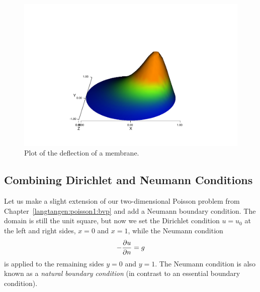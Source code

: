 \begin{figure}
  \begin{center}
    \includegraphics{chapters/langtangen/pdf/membrane_waxis.pdf}
    \caption{Plot of the deflection of a membrane.}
    \label{langtangen:poisson:2D:fig1}
  \end{center}
\end{figure}

\subsection{Combining Dirichlet and Neumann Conditions}
\label{langtangen:poisson1:DN}

Let us make a slight extension of our two-dimensional Poisson problem
from Chapter~\ref{langtangen:poisson1:bvp}
and add a Neumann boundary condition. The domain is still
the unit square, but now we set the Dirichlet condition
$u=u_0$ at the left and right sides,
$x=0$ and $x=1$, while the Neumann condition
\[ -{\partial u\over\partial n}=g \]
is applied to the remaining
sides $y=0$ and $y=1$.
The Neumann condition is also known as a \emph{natural boundary condition}
(in contrast to an essential boundary condition).

